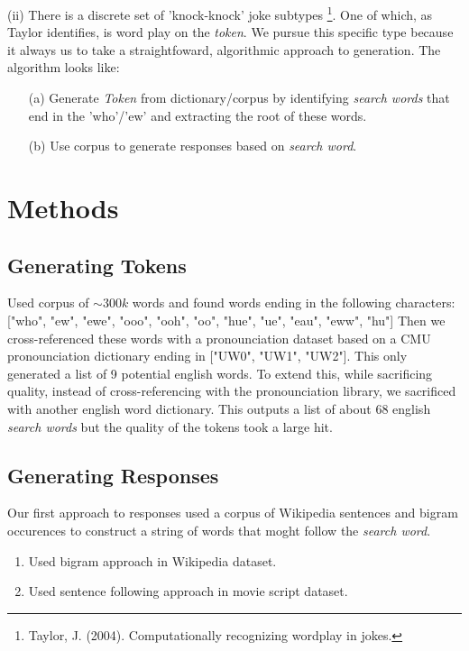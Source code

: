 \documentclass[twoside,twocolumn]{article}
\begin{document}
\noindent (ii) There is a discrete set of 'knock-knock' joke subtypes \footnote{Taylor, J. (2004). Computationally recognizing wordplay in jokes.}.
One of which, as Taylor identifies, is word play on the \emph{token}. We pursue this specific type because it always us to take a straightfoward, algorithmic approach to generation.
The algorithm looks like:
\begin{center}
    \begin{enumerate}
    \item[(a)] Generate \emph{Token} from dictionary/corpus by identifying \emph{search words} that end in the 'who'/'ew' and extracting the root of these words.
    \item[(b)] Use corpus to generate responses based on \emph{search word}.
    \end{enumerate}
\end{center}



\section{Methods}

\subsection{Generating Tokens}

Used corpus of $\sim 300k$ words and found words ending in the following characters: ["who", "ew", "ewe", "ooo", "ooh", "oo", "hue", "ue", "eau", "eww", "hu"]
Then we cross-referenced these words with a pronounciation dataset based on a CMU pronounciation dictionary ending in ["UW0", "UW1", "UW2"]. 
This only generated a list of 9 potential english words. To extend this, while sacrificing quality, instead of cross-referencing with the pronounciation library, we sacrificed with another english word dictionary. 
This outputs a list of about 68 english \emph{search words} but the quality of the tokens took a large hit.

\subsection{Generating Responses}
Our first approach to responses used a corpus of Wikipedia sentences and bigram occurences to construct a string of words that moght follow the \emph{search word}. 

\begin{enumerate}[label=(\roman*)]
\item Used bigram approach in Wikipedia dataset.
\item Used sentence following approach in movie script dataset.
\end{enumerate}
\end{document}

